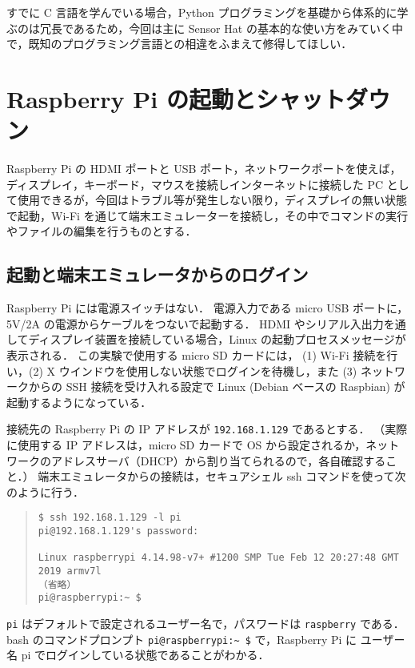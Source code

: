 \documentclass[11pt,a4,epsf]{report}
\begin{document}
すでに C 言語を学んでいる場合，Python プログラミングを基礎から体系的に学ぶのは冗長であるため，今回は主に Sensor Hat の基本的な使い方をみていく中で，既知のプログラミング言語との相違をふまえて修得してほしい．

\section{Raspberry Pi の起動とシャットダウン}

Raspberry Pi の HDMI ポートと USB ポート，ネットワークポートを使えば，ディスプレイ，キーボード，マウスを接続しインターネットに接続した PC として使用できるが，今回はトラブル等が発生しない限り，ディスプレイの無い状態で起動，Wi-Fi を通じて端末エミュレーターを接続し，その中でコマンドの実行やファイルの編集を行うものとする．

\subsection{起動と端末エミュレータからのログイン}

Raspberry Pi には電源スイッチはない．
電源入力である micro USB ポートに，5V/2A の電源からケーブルをつないで起動する．
HDMI やシリアル入出力を通してディスプレイ装置を接続している場合，Linux の起動プロセスメッセージが表示される．
この実験で使用する micro SD カードには， (1)  Wi-Fi 接続を行い，(2) X ウインドウを使用しない状態でログインを待機し，また (3) ネットワークからの SSH 接続を受け入れる設定で Linux (Debian ベースの Raspbian) が起動するようになっている．

接続先の Raspberry Pi の IP アドレスが \verb+192.168.1.129+ であるとする．
（実際に使用する IP アドレスは，micro SD カードで OS から設定されるか，ネットワークのアドレスサーバ（DHCP）から割り当てられるので，各自確認すること．）
端末エミュレータからの接続は，セキュアシェル ssh コマンドを使って次のように行う．
\begin{quote}
\small
\begin{verbatim}
$ ssh 192.168.1.129 -l pi
pi@192.168.1.129's password: 

Linux raspberrypi 4.14.98-v7+ #1200 SMP Tue Feb 12 20:27:48 GMT 2019 armv7l
（省略）
pi@raspberrypi:~ $ 
\end{verbatim}
\end{quote}
\verb+pi+ はデフォルトで設定されるユーザー名で，パスワードは \verb+raspberry+ である．
bash のコマンドプロンプト \verb+pi@raspberrypi:~ $+ で，Raspberry Pi に ユーザー名 pi でログインしている状態であることがわかる．
\end{document}
